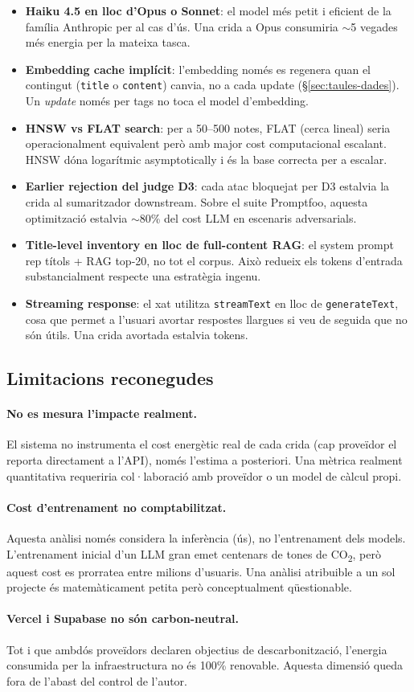 \begin{itemize}
    \item \textbf{Haiku 4.5 en lloc d'Opus o Sonnet}: el model més petit i eficient de la família Anthropic per al cas d'ús. Una crida a Opus consumiria $\sim$5 vegades més energia per la mateixa tasca.
    \item \textbf{Embedding cache implícit}: l'embedding només es regenera quan el contingut (\texttt{title} o \texttt{content}) canvia, no a cada update (\S\ref{sec:taules-dades}). Un \emph{update} només per tags no toca el model d'embedding.
    \item \textbf{HNSW vs FLAT search}: per a 50--500 notes, FLAT (cerca lineal) seria operacionalment equivalent però amb major cost computacional escalant. HNSW dóna logarítmic asymptotically i és la base correcta per a escalar.
    \item \textbf{Earlier rejection del judge D3}: cada atac bloquejat per D3 estalvia la crida al sumaritzador downstream. Sobre el suite Promptfoo, aquesta optimització estalvia $\sim$80\% del cost LLM en escenaris adversarials.
    \item \textbf{Title-level inventory en lloc de full-content RAG}: el system prompt rep títols + RAG top-20, no tot el corpus. Això redueix els tokens d'entrada substancialment respecte una estratègia ingenu.
    \item \textbf{Streaming response}: el xat utilitza \texttt{streamText} en lloc de \texttt{generateText}, cosa que permet a l'usuari avortar respostes llargues si veu de seguida que no són útils. Una crida avortada estalvia tokens.
\end{itemize}

\subsection{Limitacions reconegudes}

\paragraph{No es mesura l'impacte realment.} El sistema no instrumenta el cost energètic real de cada crida (cap proveïdor el reporta directament a l'API), només l'estima a posteriori. Una mètrica realment quantitativa requeriria col·laboració amb proveïdor o un model de càlcul propi.

\paragraph{Cost d'entrenament no comptabilitzat.} Aquesta anàlisi només considera la inferència (ús), no l'entrenament dels models. L'entrenament inicial d'un LLM gran emet centenars de tones de CO\textsubscript{2}, però aquest cost es prorratea entre milions d'usuaris. Una anàlisi atribuible a un sol projecte és matemàticament petita però conceptualment qüestionable.

\paragraph{Vercel i Supabase no són carbon-neutral.} Tot i que ambdós proveïdors declaren objectius de descarbonització, l'energia consumida per la infraestructura no és 100\% renovable. Aquesta dimensió queda fora de l'abast del control de l'autor.
